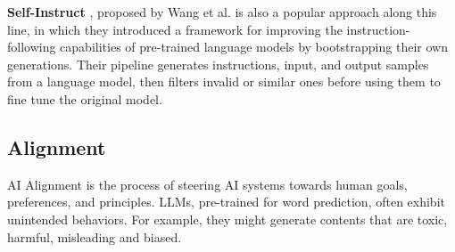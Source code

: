 \documentclass[conference]{IEEEtran}
\begin{document}




\textbf{Self-Instruct} \cite{wang2022self}, proposed by Wang et al. is also a popular approach along this line, in which they introduced a framework for improving the instruction-following capabilities of pre-trained language models by bootstrapping their own generations. Their pipeline generates instructions, input, and output samples from a language model, then filters invalid or similar ones before using them to fine tune the original model.



\subsection{Alignment}

AI Alignment is the process of steering AI systems towards human goals, preferences, and principles. LLMs, pre-trained for word prediction, often exhibit unintended behaviors. For example, they might generate contents that are toxic, harmful, misleading and biased.
\end{document}
